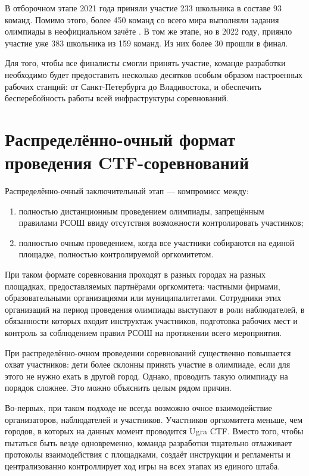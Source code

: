 В отборочном этапе 2021 года приняли участие 233 школьника в составе 93 команд. Помимо этого, более 450 команд со всего мира выполняли задания олимпиады в неофициальном зачёте \cite{Ugra21}. В том же этапе, но в 2022 году, приянло участие уже 383 школьника из 159 команд. Из них более 30 прошли в финал.

Для того, чтобы все финалисты смогли принять участие, команде разработки необходимо будет предоставить несколько десятков особым образом настроенных рабочих станций: от Санкт-Петербурга до Владивостока, и обеспечить бесперебойность работы всей инфраструктуры соревнований.


\section{Распределённо-очный формат проведения CTF-соревнований}
\label{cha:analysis:}


Распределённо-очный заключительный этап --- компромисс между:
\begin{enumerate}
  \item полностью дистанционным проведением олимпиады, запрещённым правилами РСОШ ввиду отсутствия возможности контролировать участинков;
  \item полностью очным проведением, когда все участники собираются на единой площадке, полностью контролируемой оргкомитетом.
\end{enumerate}

При таком формате соревнования проходят в разных городах на разных площадках, предоставляемых партнёрами оргкомитета: частными фирмами, образовательными организациями или муниципалитетами.
Сотрудники этих организаций на период проведения олимпиады выступают в роли наблюдателей, в обязанности которых входит инструктаж участников, подготовка рабочих мест и контроль за соблюдением правил РСОШ на протяжении всего мероприятия.

При распределённо-очном проведении соревнований существенно повышается охват участников: дети более склонны принять участие в олимпиаде, если для этого не нужно ехать в другой город. Однако, проводить такую олимпиаду на порядок сложнее. Это можно объяснить целым рядом причин.

Во-первых, при таком подходе не всегда возможно очное взаимодействие организаторов, наблюдателей и участников. Участников оргкомитета меньше, чем городов, в которых на данных момент проводится Ugra CTF. Вместо того, чтобы пытаться быть везде одновременно, команда разработки тщательно отлаживает протоколы взаимодействия с площадками, создаёт инструкции и регламенты и централизованно контроллирует ход игры на всех этапах из единого штаба.

